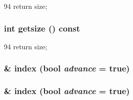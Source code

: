 \begin{DoxyCode}
94 { return size; }
\end{DoxyCode}
\hypertarget{classMipsISA_1_1TLB_ae121404a6cfcf714e05fe2231ce4c7fc}{
\subsubsection[{getsize}]{\setlength{\rightskip}{0pt plus 5cm}int getsize () const}}
\label{classMipsISA_1_1TLB_ae121404a6cfcf714e05fe2231ce4c7fc}



\begin{DoxyCode}
94 { return size; }
\end{DoxyCode}
\hypertarget{classMipsISA_1_1TLB_ac695a929cdc93bd1cc81c1c7f7c5d743}{
\subsubsection[{index}]{\& index (bool {\em advance} = {\ttfamily true})}}
\label{classMipsISA_1_1TLB_ac695a929cdc93bd1cc81c1c7f7c5d743}
\hypertarget{classMipsISA_1_1TLB_ad4b919b0718938b6a12952a6d5fc658e}{
\subsubsection[{index}]{ \& index (bool {\em advance} = {\ttfamily true})}}
\label{classMipsISA_1_1TLB_ad4b919b0718938b6a12952a6d5fc658e}



